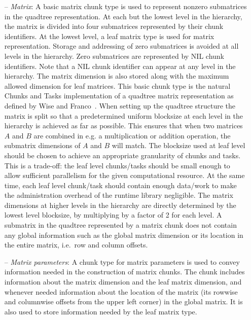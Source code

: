 \documentclass{elsarticle}
\begin{document}
\begin{itemize}
\item[--]\emph{Matrix}: A basic matrix chunk type is used to represent
  nonzero submatrices in the quadtree representation. At each but the
  lowest level in the hierarchy, the matrix is divided into four
  submatrices represented by their chunk identifiers. At the lowest
  level, a leaf matrix type is used for matrix representation.
  Storage and addressing of zero submatrices is avoided at all levels in
  the hierarchy. Zero submatrices are represented by NIL chunk
  identifiers. Note that a NIL chunk identifier can appear at any level
  in the hierarchy.
  The matrix dimension is also stored along with the
  maximum allowed dimension for leaf matrices. This basic chunk type
  is the natural Chunks and Tasks implementation of a quadtree matrix
  representation as defined by Wise and Franco~\cite{WiseAndFranco1990}.
  When setting up the quadtree structure the matrix is split so that a
  predetermined uniform blocksize at each level in the hierarchy is
  achieved as far as possible. This ensures that when two matrices $A$
  and $B$ are combined in e.g. a multiplication or addition operation,
  the submatrix dimensions of $A$ and $B$ will match.  The blocksize
  used at leaf level should be chosen to achieve an appropriate
  granularity of chunks and tasks.  This is a trade-off: the leaf level
  chunks/tasks should be small enough to allow sufficient parallelism
  for the given computational resource.  At the same time, each leaf
  level chunk/task should contain enough data/work to make the
  administration overhead of the runtime library negligible. The matrix
  dimensions at higher levels in the hierarchy are directly determined
  by the lowest level blocksize, by multiplying by a factor of 2 for
  each level.
  A submatrix in
  the quadtree represented by a matrix chunk does not contain any
  global information such as the global matrix dimension or its
  location in the entire matrix, i.e.~row and column offsets.
\item[--]\emph{Matrix parameters}: A chunk type for matrix parameters
  is used to convey information needed in the construction of matrix
  chunks.  The chunk includes information about the matrix dimension
  and the leaf matrix dimension, and whenever needed information about
  the location of the matrix (its rowwise and columnwise offsets from
  the upper left corner) in the global matrix. It is also used to
  store information needed by the leaf matrix type.
\end{itemize}
\end{document}

